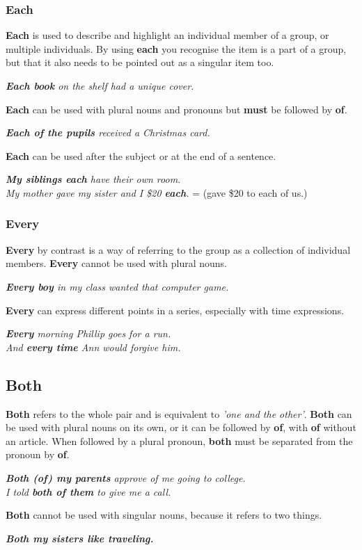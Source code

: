 \documentclass[hidelinks,10pt,a4paper]{article}
\begin{document}
\subsubsection{Each}
\textbf{Each} is used to describe and highlight an individual member of a group, or multiple individuals. By using \textbf{each} you recognise the item is a part of a group, but that it also needs to be pointed out as a singular item too.
\begin{center}
\textit{ \textbf{Each book} on the shelf had a unique cover.}
\end{center}
\textbf{Each} can be used with plural nouns and pronouns but \textbf{must} be followed by \textbf{of}.
\begin{center}
\textit{ \textbf{Each of the pupils} received a Christmas card.}
\end{center}
\textbf{Each} can be used after the subject or at the end of a sentence.
\begin{center}
\textit{ \textbf{My siblings each} have their own room.\\
My mother gave my sister and I \$20 \textbf{each}.} = (gave \$20 to each of us.)
\end{center}
\subsubsection{Every}
\textbf{Every} by contrast is a way of referring to the group as a collection of individual members. \textbf{Every} cannot be used with plural nouns.
\begin{center}
\textit{  \textbf{Every boy} in my class wanted that computer game.}
\end{center}
\textbf{Every} can express different points in a series, especially with time expressions.
\begin{center}
\textit{ \textbf{Every} morning Phillip goes for a run.\\
And \textbf{every time} Ann would forgive him.}
\end{center}

\subsection{Both}
\textbf{Both} refers to the whole pair and is equivalent to \textit{'one and the other'}. \textbf{Both} can be used with plural nouns on its own, or it can be followed by \textbf{of}, with \textbf{of} without an article. When followed by a plural pronoun, \textbf{both} must be separated from the pronoun by \textbf{of}.
\begin{center}
		\textit{ \textbf{Both (of) my parents} approve of me going to college.\\
		I told \textbf{both of them} to give me a call.}
\end{center}
\textbf{Both} cannot be used with singular nouns, because it refers to two things.
\begin{center}
\textit{  \textbf{Both my sisters like traveling.}}
\end{center}
\end{document}

